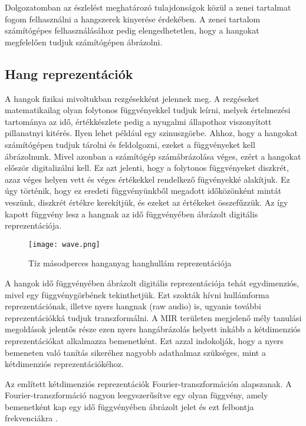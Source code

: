 Dolgozatomban az észlelést meghatározó tulajdonságok közül a zenei tartalmat fogom felhasználni a hangszerek kinyerése érdekében. A zenei tartalom számítógépes felhasználásához pedig elengedhetetlen, hogy a hangokat megfelelően tudjuk számítógépen ábrázolni.

\subsection{Hang reprezentációk}

A hangok fizikai mivoltukban rezgésekként jelennek meg. A rezgéseket matematikailag olyan folytonos függvényekkel tudjuk leírni, melyek értelmezési tartománya az idő, értékkészlete pedig a nyugalmi állapothoz viszonyított pillanatnyi kitérés. Ilyen lehet például egy szinuszgörbe. Ahhoz, hogy a hangokat számítógépen tudjuk tárolni és feldolgozni, ezeket a függvényeket kell ábrázolnunk.  Mivel azonban a számítógép számábrázolása véges, ezért a hangokat először digitalizálni kell. Ez azt jelenti, hogy a folytonos függvényeket diszkrét, azaz véges helyen vett és véges értékekkel rendelkező fügvényekké alakítjuk. Ez úgy történik, hogy ez eredeti függvényünkből megadott időközönként mintát veszünk, diszkrét értékre kerekítjük, és ezeket az értékeket összefűzzük. Az így kapott függvény lesz a hangnak az idő függvényében ábrázolt digitális reprezentációja.
\begin{figure}[H]
  \centering
  \texttt{[image: wave.png]}
  \caption{Tíz másodperces hanganyag hanghullám reprezentációja}
\end{figure}

A hangok idő függvényében ábrázolt digitális reprezentációja tehát egydimenziós, mivel egy függvénygörbének tekinthetjük. Ezt szokták hívni hullámforma reprezentációnak, illetve nyers hangnak (raw audio) is, ugyanis további reprezentációkká tudjuk transzformálni. A MIR területen megjelenő mély tanulási megoldások jelentős része ezen nyers hangábrázolás helyett inkább a kétdimenziós reprezentációkat alkalmazza bemenetként. Ezt azzal indokolják, hogy a nyers bemeneten való tanítás sikeréhez nagyobb adathalmaz szükséges, mint a kétdimenziós reprezentációkéhoz. \cite{Choi2017}

Az említett kétdimenziós reprezentációk Fourier-transzformáción alapszanak. A Fourier-transzformáció nagyon leegyszerűsítve egy olyan függvény, amely bemenetként kap egy idő függvényében ábrázolt jelet és ezt felbontja frekvenciákra \cite{melspec}.

